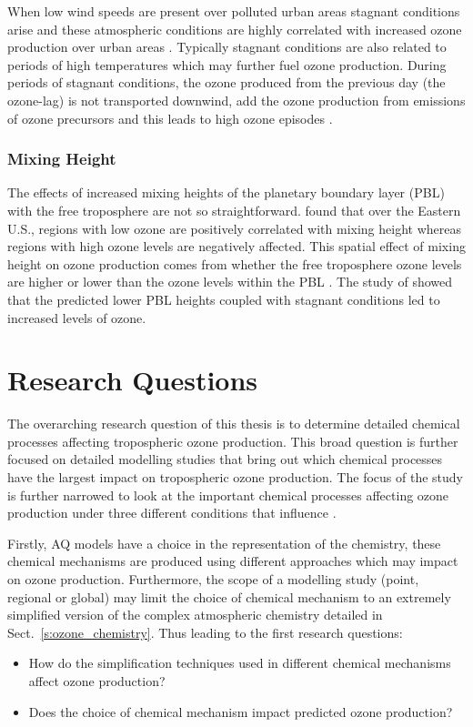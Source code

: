 When low wind speeds are present over polluted urban areas stagnant conditions arise and these atmospheric conditions are highly correlated with increased ozone production over urban areas \citep{Jacob:2009}.
Typically stagnant conditions are also related to periods of high temperatures which may further fuel ozone production.
During periods of stagnant conditions, the ozone produced from the previous day (the ozone-lag) is not transported downwind, add the ozone production from emissions of ozone precursors and this leads to high ozone episodes \citep{Jacob:2009}.

\subsubsection{Mixing Height}
The effects of increased mixing heights of the planetary boundary layer (PBL) with the free troposphere are not so straightforward.
\citet{Dawson:2007} found that over the Eastern U.S., regions with low ozone are positively correlated with mixing height whereas regions with high ozone levels are negatively affected.
This spatial effect of mixing height on ozone production comes from whether the free troposphere ozone levels are higher or lower than the ozone levels within the PBL \citep{Jacob:2009}.
The study of \citet{Dawson:2009} showed that the predicted lower PBL heights coupled with stagnant conditions led to increased levels of ozone.

\section{Research Questions} \label{s:research_questions}
The overarching research question of this thesis is to determine detailed chemical processes affecting tropospheric ozone production.
This broad question is further focused on detailed modelling studies that bring out which chemical processes have the largest impact on tropospheric ozone production.
The focus of the study is further narrowed to look at the important chemical processes affecting ozone production under three different conditions that influence .

Firstly, AQ models have a choice in the representation of the chemistry, these chemical mechanisms are produced using different approaches which may impact on ozone production.
Furthermore, the scope of a modelling study (point, regional or global) may limit the choice of chemical mechanism to an extremely simplified version of the complex atmospheric chemistry detailed in Sect.~\ref{s:ozone_chemistry}.
Thus leading to the first research questions:
\begin{itemize}
	\item How do the simplification techniques used in different chemical mechanisms affect ozone production? 
    \item Does the choice of chemical mechanism impact predicted ozone production?
\end{itemize}

